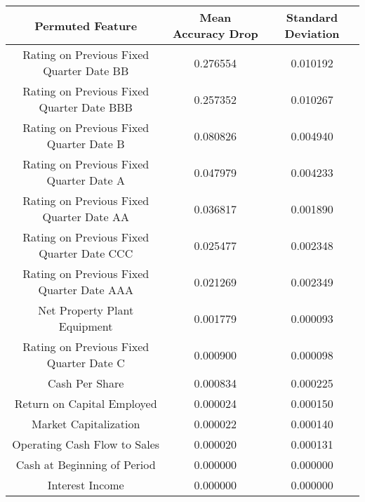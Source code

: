 \tiny
\begin{tabular}{ccc}
\toprule
Permuted Feature & Mean Accuracy Drop & Standard Deviation \\
\midrule
Rating on Previous Fixed Quarter Date BB & 0.276554 & 0.010192 \\
Rating on Previous Fixed Quarter Date BBB & 0.257352 & 0.010267 \\
Rating on Previous Fixed Quarter Date B & 0.080826 & 0.004940 \\
Rating on Previous Fixed Quarter Date A & 0.047979 & 0.004233 \\
Rating on Previous Fixed Quarter Date AA & 0.036817 & 0.001890 \\
Rating on Previous Fixed Quarter Date CCC & 0.025477 & 0.002348 \\
Rating on Previous Fixed Quarter Date AAA & 0.021269 & 0.002349 \\
Net Property Plant Equipment & 0.001779 & 0.000093 \\
Rating on Previous Fixed Quarter Date C & 0.000900 & 0.000098 \\
Cash Per Share & 0.000834 & 0.000225 \\
Return on Capital Employed & 0.000024 & 0.000150 \\
Market Capitalization & 0.000022 & 0.000140 \\
Operating Cash Flow to Sales & 0.000020 & 0.000131 \\
Cash at Beginning of Period & 0.000000 & 0.000000 \\
Interest Income & 0.000000 & 0.000000 \\
\bottomrule
\end{tabular}

\normalsize